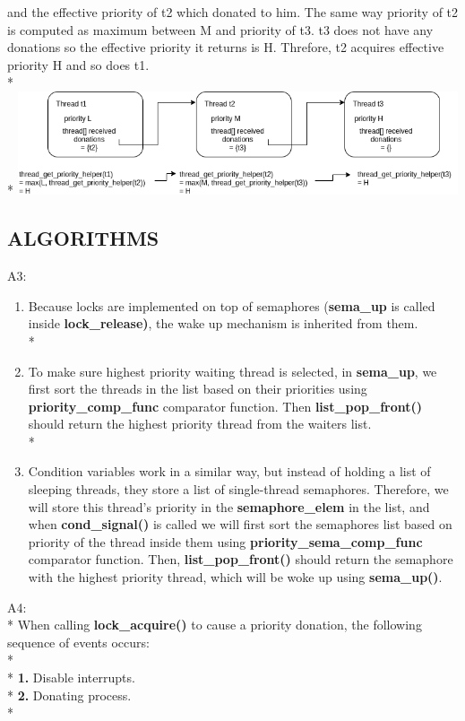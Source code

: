 \documentclass{article}
\begin{document}
and the effective priority of t2 which donated to him. The same way priority of t2 is
computed as maximum between M and priority of t3. t3 does not have any donations so the
effective priority it returns is H. Threfore, t2 acquires effective priority H and so does t1.\\*\\*
\includegraphics[width=13cm]{nested_donations}

\subsection*{ALGORITHMS}
\justify

A3:
\begin{enumerate}[label=(\roman*)]
  \item Because locks are implemented on top of semaphores (\textbf{sema\_up} is called inside \textbf{lock\_release)},
  the wake up mechanism is inherited from them.\\*
  \item To make sure highest priority waiting thread is selected, in \textbf{sema\_up}, we first
  sort the threads in the list based on their priorities using \textbf{priority\_comp\_func}
  comparator function. Then \textbf{list\_pop\_front()} should return the highest priority
  thread from the waiters list.\\*
  \item Condition variables work in a similar way, but instead of holding a list of sleeping threads,
  they store a list of single-thread semaphores. Therefore, we will store this thread's priority in the
  \textbf{semaphore\_elem} in the list, and when \textbf{cond\_signal()} is called we will first sort the semaphores list
  based on priority of the thread inside them using \textbf{priority\_sema\_comp\_func} comparator function.
  Then, \textbf{list\_pop\_front()} should return the semaphore with the highest priority thread, which will be
  woke up using \textbf{sema\_up()}.
\end{enumerate}
A4:\\*
When calling \textbf{lock\_acquire()} to cause a priority donation, the following sequence of events occurs:
\\*\\*
\textbf{1.} Disable interrupts.
\\*
  \textbf{2.} Donating process.
\\*
\end{document}
